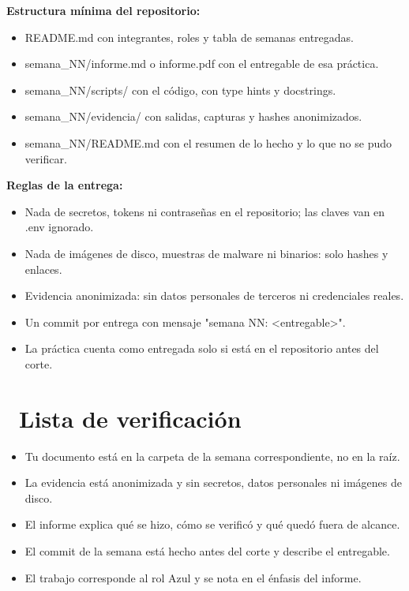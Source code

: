 \documentclass[11pt,a4paper]{article}
\newcommand{\iconotexto}[2]{\textcolor{cyanNeon}{\faIcon{#1}}~#2}
\begin{document}
\textbf{Estructura mínima del repositorio:}

\begin{itemize}[leftmargin=1.4em,itemsep=2pt,topsep=3pt]
  \item README.md con integrantes, roles y tabla de semanas entregadas.
  \item semana\_NN/informe.md o informe.pdf con el entregable de esa práctica.
  \item semana\_NN/scripts/ con el código, con type hints y docstrings.
  \item semana\_NN/evidencia/ con salidas, capturas y hashes anonimizados.
  \item semana\_NN/README.md con el resumen de lo hecho y lo que no se pudo verificar.
\end{itemize}

\textbf{Reglas de la entrega:}

\begin{itemize}[leftmargin=1.4em,itemsep=2pt,topsep=3pt]
  \item Nada de secretos, tokens ni contraseñas en el repositorio; las claves van en .env ignorado.
  \item Nada de imágenes de disco, muestras de malware ni binarios: solo hashes y enlaces.
  \item Evidencia anonimizada: sin datos personales de terceros ni credenciales reales.
  \item Un commit por entrega con mensaje "semana NN: \textless{}entregable\textgreater{}".
  \item La práctica cuenta como entregada solo si está en el repositorio antes del corte.
\end{itemize}

\section{\iconotexto{clipboard-check}{Lista de verificación}}

\begin{itemize}[leftmargin=1.4em,itemsep=2pt,topsep=3pt]
  \item Tu documento está en la carpeta de la semana correspondiente, no en la raíz.
  \item La evidencia está anonimizada y sin secretos, datos personales ni imágenes de disco.
  \item El informe explica qué se hizo, cómo se verificó y qué quedó fuera de alcance.
  \item El commit de la semana está hecho antes del corte y describe el entregable.
  \item El trabajo corresponde al rol Azul y se nota en el énfasis del informe.
\end{itemize}
\end{document}
